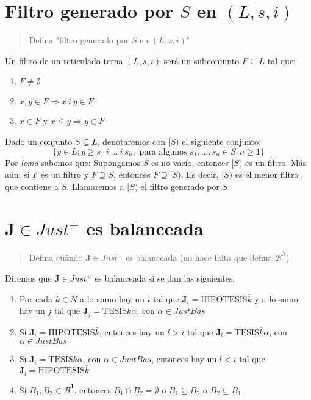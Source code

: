 \documentclass{article}
\begin{document}
\section{Filtro generado por $S$ en $(L,s,i)$}
\begin{quote}
  Defina "filtro generado por $S$ en $(L,s,i)$"
\end{quote}
Un filtro de un reticulado terna $(L,s,i)$ será un subconjunto $F\subseteq L$ tal que:
\begin{enumerate}
  \item $F\neq\emptyset$
  \item $x,y\in F\Rightarrow x\ i\ y\in F$
  \item $x\in F$ y $x\leq y\Rightarrow y\in F$
\end{enumerate}
Dado un conjunto $S\subseteq L$, denotaremos con $[S)$ el siguiente conjunto:
\begin{equation*}
  \{y\in L:y\geq s_1\ i\ \dots\ i\ s_n,\text{ para algunos }s_1,\dots,s_n\in S,n\geq 1\}
\end{equation*}
Por \textit{lema} sabemos que: Supongamos $S$ es no vacío, entonces $[S)$ es un filtro. Más aún, si $F$ es un filtro y $F\supseteq S$, entonces $F\supseteq [S)$. Es decir, $[S)$ es el menor filtro que contiene a $S$.
\newline
Llamaremos a $[S)$ el filtro generado por $S$

\section{$\mathbf{J}\in Just^+$ es balanceada}
\begin{quote}
  Defina cuándo $\mathbf{J}\in Just^+$ es balanceada (no hace falta que defina $\mathcal{B}^\mathbf{J}$)
\end{quote}
Diremos que $\mathbf{J}\in Just^+$ es balanceada si se dan las siguientes:
\begin{enumerate}
  \item Por cada $k\in N$ a lo sumo hay un $i$ tal que $\mathbf{J}_i=\text{HIPOTESIS}\bar{k}$ y a lo sumo hay un $j$ tal que $\mathbf{J}_j=\text{TESIS}\bar{k}\alpha$, con $\alpha\in JustBas$
  \item Si $\mathbf{J}_i=\text{HIPOTESIS}\bar{k}$, entonces hay un $l>i$ tal que $\mathbf{J}_l=\text{TESIS}\bar{k}\alpha$, con $\alpha\in JustBas$
  \item Si $\mathbf{J}_i=\text{TESIS}\bar{k}\alpha$, con $\alpha\in JustBas$, entonces hay un $l<i$ tal que $\mathbf{J}_l=\text{HIPOTESIS}\bar{k}$
  \item Si $B_1,B_2\in\mathcal{B}^\mathbf{J}$, entonces $B_1\cap B_2=\emptyset$ o $B_1\subseteq B_2$ o $B_2\subseteq B_1$
\end{enumerate}
\end{document}
